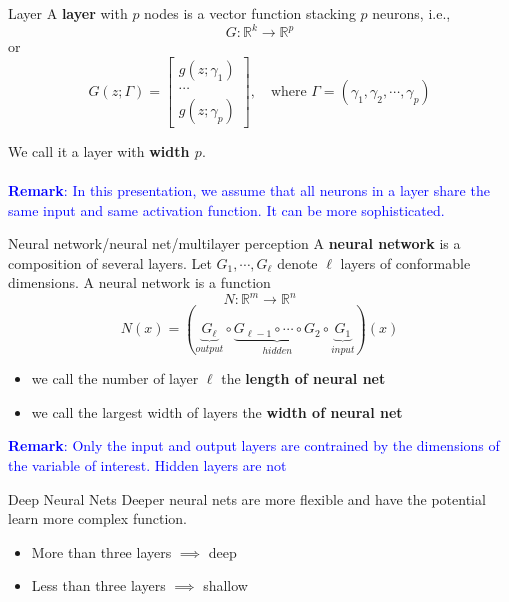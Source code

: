 \documentclass[aspectratio=169]{beamer} %
\begin{document}
\begin{frame}{Layer}
A \textbf{layer} with $p$ nodes is a vector function stacking $p$ neurons, i.e.,
$$
G:\mathbb{R}^k \to \mathbb{R}^p
$$
or
$$
G(z;\Gamma)  = \begin{bmatrix}
    g(z;\gamma_1)\\
    \cdots\\
    g(z;\gamma_p)
\end{bmatrix},\quad \text{where $\Gamma = (\gamma_1, \gamma_2,\cdots, \gamma_p)$}
$$

We call it a layer with \textbf{width $p$}.\\
\\
\textcolor{blue}{\textbf{Remark}: In this presentation, we assume that all neurons in a layer share the same input and same activation function. It can be more sophisticated.}
\end{frame}

\begin{frame}{Neural network/neural net/multilayer perception}
    A \textbf{neural network} is a composition of several layers. Let $G_1,\cdots, G_\ell$ denote $\ell$ layers of conformable dimensions. A neural network is a function
    $$
    N:\mathbb{R}^m \to \mathbb{R}^n
    $$
    $$
    N(x) = (\underbrace{G_\ell}_{output} \circ \underbrace{G_{\ell-1} \circ \cdots\circ G_2}_{hidden}\circ \underbrace{G_1}_{input})(x)
    $$

    \begin{itemize}
        \item we call the number of layer $\ell$ the \textbf{length of neural net}
        \item we call the largest width of layers the \textbf{width of neural net}
    \end{itemize}
    \textcolor{blue}{\textbf{Remark}: Only the input and output layers are contrained by the dimensions of the variable of interest. Hidden layers are not}
\end{frame}
\begin{frame}{Deep Neural Nets}
Deeper neural nets are more flexible and have the potential learn more complex function.
    \begin{itemize}
        \item More than three layers $\implies$ deep
        \item Less than three layers $\implies$ shallow 
    \end{itemize}
\end{frame}
\end{document}
